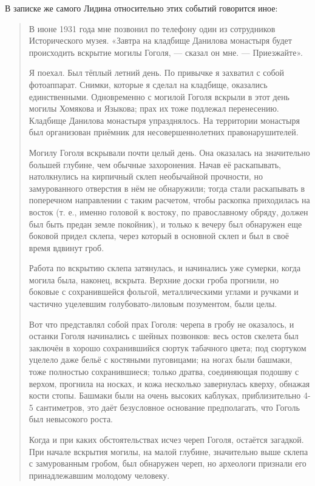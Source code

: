 \documentclass[a5paper,11pt,openany]{article}
\begin{document}
В записке же самого Лидина относительно этих событий говорится иное:

\begin{quotation}
В июне 1931 года мне позвонил по телефону один из сотрудников Исторического музея.
«Завтра на кладбище Данилова монастыря будет происходить вскрытие могилы Гоголя, — сказал он мне. — Приезжайте».

Я поехал. Был тёплый летний день. По привычке я захватил с собой фотоаппарат. Снимки, которые я сделал на кладбище, оказались единственными. Одновременно с могилой Гоголя вскрыли в этот день могилы Хомякова и Языкова; прах их тоже подлежал перенесению. Кладбище Данилова монастыря упразднялось. На территории монастыря был организован приёмник для несовершеннолетних правонарушителей.

Могилу Гоголя вскрывали почти целый день. Она оказалась на значительно большей глубине, чем обычные захоронения. Начав её раскапывать, натолкнулись на кирпичный склеп необычайной прочности, но замурованного отверстия в нём не обнаружили; тогда стали раскапывать в поперечном направлении с таким расчетом, чтобы раскопка приходилась на восток (т. е., именно головой к востоку, по православному обряду, должен был быть предан земле покойник), и только к вечеру был обнаружен еще боковой придел склепа, через который в основной склеп и был в своё время вдвинут гроб.

Работа по вскрытию склепа затянулась, и начинались уже сумерки, когда могила была, наконец, вскрыта. Верхние доски гроба прогнили, но боковые с сохранившейся фольгой, металлическими углами и ручками и частично уцелевшим голубовато-лиловым позументом, были целы.

Вот что представлял собой прах Гоголя:
черепа в гробу не оказалось, и останки Гоголя начинались с шейных позвонков: весь остов скелета был заключён в хорошо сохранившийся сюртук табачного цвета; под сюртуком уцелело даже бельё с костяными пуговицами; на ногах были башмаки, тоже полностью сохранившиеся; только дратва, соединяющая подошву с верхом, прогнила на носках, и кожа несколько завернулась кверху, обнажая кости стопы. Башмаки были на очень высоких каблуках, приблизительно 4-5 сантиметров, это даёт безусловное основание предполагать, что Гоголь был невысокого роста.

Когда и при каких обстоятельствах исчез череп Гоголя, остаётся загадкой. При начале вскрытия могилы, на малой глубине, значительно выше склепа с замурованным гробом, был обнаружен череп, но археологи признали его принадлежавшим молодому человеку.


\end{quotation}
\end{document}
